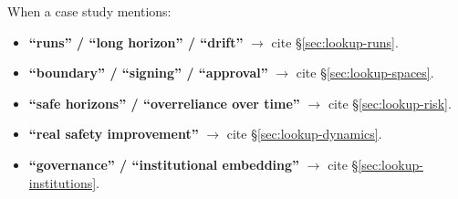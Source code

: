 When a case study mentions:
\begin{itemize}
\item \textbf{``runs'' / ``long horizon'' / ``drift''} $\to$ cite \S\ref{sec:lookup-runs}.
\item \textbf{``boundary'' / ``signing'' / ``approval''} $\to$ cite \S\ref{sec:lookup-spaces}.
\item \textbf{``safe horizons'' / ``overreliance over time''} $\to$ cite \S\ref{sec:lookup-risk}.
\item \textbf{``real safety improvement''} $\to$ cite \S\ref{sec:lookup-dynamics}.
\item \textbf{``governance'' / ``institutional embedding''} $\to$ cite \S\ref{sec:lookup-institutions}.
\end{itemize}

\clearpage
